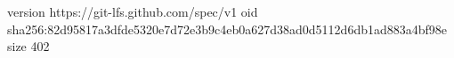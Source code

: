 version https://git-lfs.github.com/spec/v1
oid sha256:82d95817a3dfde5320e7d72e3b9c4eb0a627d38ad0d5112d6db1ad883a4bf98e
size 402
